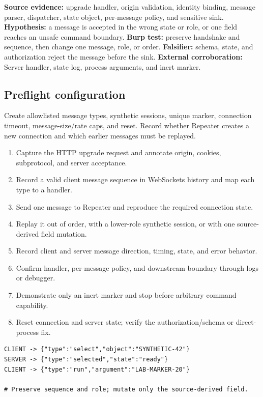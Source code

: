 \documentclass[11pt]{article}
\newcommand{\weekfield}[2]{%
  \Needspace{5\baselineskip}
  \subsection*{#1}
  #2
}
\newcommand{\externalproof}[1]{\textbf{External corroboration:} #1}
\begin{document}
\begin{bridgebox}
\textbf{Source evidence:} upgrade handler, origin validation, identity binding,
message parser, dispatcher, state object, per-message policy, and sensitive sink.
\textbf{Hypothesis:} a message is accepted in the wrong state or role, or one
field reaches an unsafe command boundary. \textbf{Burp test:} preserve handshake
and sequence, then change one message, role, or order. \textbf{Falsifier:} schema,
state, and authorization reject the message before the sink. \externalproof{Server
handler, state log, process arguments, and inert marker.}
\end{bridgebox}

\weekfield{Preflight configuration}{Create allowlisted message types, synthetic
sessions, unique marker, connection timeout, message-size/rate caps, and reset.
Record whether Repeater creates a new connection and which earlier messages must
be replayed.}

\begin{procedurebox}
\begin{enumerate}
  \item Capture the HTTP upgrade request and annotate origin, cookies, subprotocol, and server acceptance.
  \item Record a valid client message sequence in WebSockets history and map each type to a handler.
  \item Send one message to Repeater and reproduce the required connection state.
  \item Replay it out of order, with a lower-role synthetic session, or with one source-derived field mutation.
  \item Record client and server message direction, timing, state, and error behavior.
  \item Confirm handler, per-message policy, and downstream boundary through logs or debugger.
  \item Demonstrate only an inert marker and stop before arbitrary command capability.
  \item Reset connection and server state; verify the authorization/schema or direct-process fix.
\end{enumerate}
\end{procedurebox}

\begin{lstlisting}[caption={Sanitized WebSocket sequence}]
CLIENT -> {"type":"select","object":"SYNTHETIC-42"}
SERVER -> {"type":"selected","state":"ready"}
CLIENT -> {"type":"run","argument":"LAB-MARKER-20"}

# Preserve sequence and role; mutate only the source-derived field.
\end{lstlisting}
\end{document}
